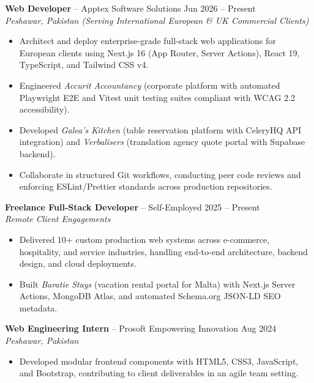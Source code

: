 \documentclass[10pt,a4paper]{article}
\begin{document}
\textbf{Web Developer} -- Apptex Software Solutions \hfill Jun 2026 -- Present \\
\textit{Peshawar, Pakistan (Serving International European \& UK Commercial Clients)}
\begin{itemize}
    \item Architect and deploy enterprise-grade full-stack web applications for European clients using Next.js 16 (App Router, Server Actions), React 19, TypeScript, and Tailwind CSS v4.
    \item Engineered \textit{Accurit Accountancy} (corporate platform with automated Playwright E2E and Vitest unit testing suites compliant with WCAG 2.2 accessibility).
    \item Developed \textit{Galea's Kitchen} (table reservation platform with CeleryHQ API integration) and \textit{Verbalisers} (translation agency quote portal with Supabase backend).
    \item Collaborate in structured Git workflows, conducting peer code reviews and enforcing ESLint/Prettier standards across production repositories.
\end{itemize}

\vspace{4pt}
\textbf{Freelance Full-Stack Developer} -- Self-Employed \hfill 2025 -- Present \\
\textit{Remote Client Engagements}
\begin{itemize}
    \item Delivered 10+ custom production web systems across e-commerce, hospitality, and service industries, handling end-to-end architecture, backend design, and cloud deployments.
    \item Built \textit{Baratie Stays} (vacation rental portal for Malta) with Next.js Server Actions, MongoDB Atlas, and automated Schema.org JSON-LD SEO metadata.
\end{itemize}

\vspace{4pt}
\textbf{Web Engineering Intern} -- Prosoft Empowering Innovation \hfill Aug 2024 \\
\textit{Peshawar, Pakistan}
\begin{itemize}
    \item Developed modular frontend components with HTML5, CSS3, JavaScript, and Bootstrap, contributing to client deliverables in an agile team setting.
\end{itemize}

\end{document}
